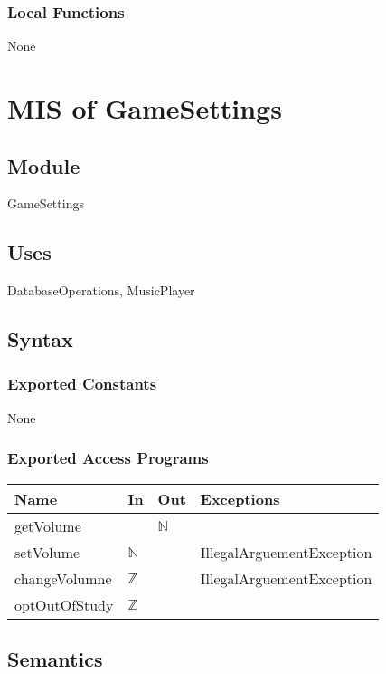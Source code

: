 \documentclass[12pt, titlepage]{article}
\begin{document}
\subsubsection{Local Functions}

None

\medskip
\newpage
\section{MIS of GameSettings} 


\subsection{Module}
GameSettings

\subsection{Uses}
DatabaseOperations, MusicPlayer


\subsection{Syntax}

\subsubsection{Exported Constants}
None

\subsubsection{Exported Access Programs}

\begin{center}
\begin{tabular}{p{4cm} p{4cm} p{4cm} p{2cm}}
\hline
\textbf{Name} & \textbf{In} & \textbf{Out} & \textbf{Exceptions} \\
\hline
getVolume &  & $\mathbb{N}$ &  \\
\hline
setVolume & $\mathbb{N}$  &  & IllegalArguementException \\
\hline
changeVolumne & $\mathbb{Z}$  &  & IllegalArguementException \\
\hline
optOutOfStudy & $\mathbb{Z}$ &  & \\
\hline
\end{tabular}
\end{center}

\subsection{Semantics}
\end{document}
